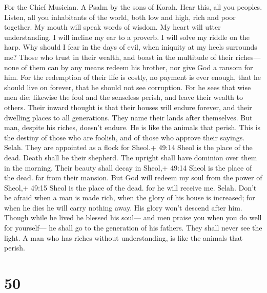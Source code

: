 For the Chief Musician. A Psalm by the sons of Korah.  Hear
this, all you peoples. Listen, all you inhabitants of the world,
 both low and high, rich and poor together.  My
mouth will speak words of wisdom. My heart will utter understanding.
 I will incline my ear to a proverb. I will solve my riddle
on the harp.  Why should I fear in the days of evil, when
iniquity at my heels surrounds me?  Those who trust in their
wealth, and boast in the multitude of their riches---  none
of them can by any means redeem his brother, nor give God a ransom for
him.  For the redemption of their life is costly, no payment
is ever enough,  that he should live on forever, that he
should not see corruption.  For he sees that wise men die;
likewise the fool and the senseless perish, and leave their wealth to
others.  Their inward thought is that their houses will
endure forever, and their dwelling places to all generations. They name
their lands after themselves.  But man, despite his riches,
doesn't endure. He is like the animals that perish.  This
is the destiny of those who are foolish, and of those who approve their
sayings. Selah.  They are appointed as a flock for Sheol.+
49:14 Sheol is the place of the dead. Death shall be their shepherd. The
upright shall have dominion over them in the morning. Their beauty shall
decay in Sheol,+ 49:14 Sheol is the place of the dead. far from their
mansion.  But God will redeem my soul from the power of
Sheol,+ 49:15 Sheol is the place of the dead. for he will receive me.
Selah.  Don't be afraid when a man is made rich, when the
glory of his house is increased;  for when he dies he will
carry nothing away. His glory won't descend after him. 
Though while he lived he blessed his soul--- and men praise you when you
do well for yourself---  he shall go to the generation of
his fathers. They shall never see the light.  A man who has
riches without understanding, is like the animals that perish.

\hypertarget{section-48}{%
\section{50}\label{section-48}}

